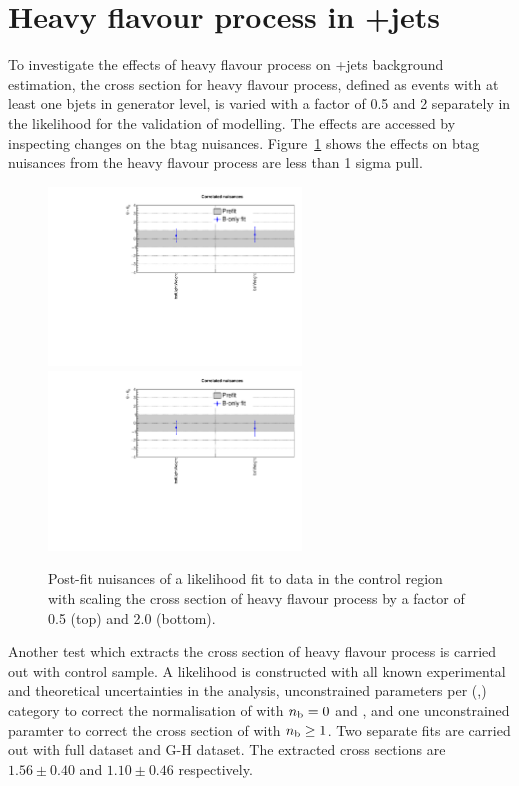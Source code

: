 
\section{Heavy flavour process in \znunu+jets}
\label{sec:zplusbb_app}

To investigate the effects of heavy flavour process on \znunu+jets 
background estimation, the cross section for heavy flavour process, 
defined as events with at least one bjets in generator level, is varied 
with a factor of 0.5 and 2 separately in the likelihood for the 
validation of \nb modelling. The effects are accessed by inspecting 
changes on the btag nuisances. Figure~\ref{fig:zplusbb} shows the effects 
on btag nuisances from the heavy flavour process are less than 1 sigma pull.
\par

\begin{figure}[h!]
  \centering
  \includegraphics[width=0.6\textwidth]{figures/ZPlusbb/TemplateFitv1_HFXs0p5}
  \includegraphics[width=0.6\textwidth]{figures/ZPlusbb/TemplateFitv1_HFXs2p0}
  \caption{\label{fig:btagsfge1b} Post-fit nuisances of a likelihood
    fit to data in the \mmj control region with scaling the cross section of heavy 
    flavour process by a factor of 0.5 (top) and 2.0 (bottom). }
  \label{fig:zplusbb}
\end{figure}

Another test which extracts the cross section of heavy flavour process is carried out 
with \mmj control sample. A likelihood is constructed with all known experimental and 
theoretical uncertainties in the analysis, unconstrained parameters per (\njet,\scalht) 
category to correct the normalisation of \zmmj with $n_{\text{b}} = 0$ and \ttj, and one 
unconstrained paramter to correct the cross section of \zmumuj with $n_{\text{b}} \geq 1$. Two separate 
fits are carried out with full dataset and G-H dataset. The extracted cross sections are 
$1.56 \pm 0.40$ and $1.10 \pm 0.46$ respectively.

